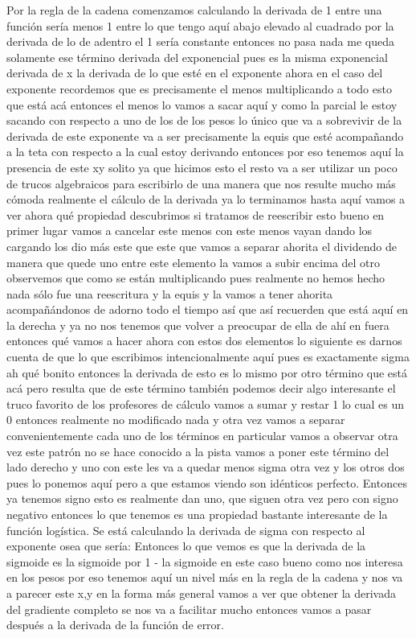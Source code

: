 Por la regla de la cadena comenzamos calculando la derivada de 1 entre una función sería menos 1 entre lo que tengo aquí abajo elevado al cuadrado por la derivada de lo de adentro el 1 sería constante entonces no pasa nada me queda solamente ese término derivada del exponencial pues es la misma exponencial derivada de x la derivada de lo que esté en el exponente ahora en el caso del exponente recordemos que es precisamente el menos multiplicando a todo esto que está acá entonces el menos lo vamos a sacar aquí y como la parcial le estoy sacando con respecto a uno de los de los pesos lo único que va a sobrevivir de la derivada de este exponente va a ser precisamente la equis que esté acompañando a la teta con respecto a la cual estoy derivando entonces por eso tenemos aquí la presencia de este xy solito ya que hicimos esto el resto va a ser utilizar un poco de trucos algebraicos para escribirlo de una manera que nos resulte mucho más cómoda realmente el cálculo de la derivada ya lo terminamos hasta aquí vamos a ver ahora qué propiedad descubrimos si tratamos de reescribir esto bueno en primer lugar vamos a cancelar este menos con este menos vayan dando los cargando los dio más este que este que vamos a separar ahorita el dividendo de manera que quede uno entre este elemento la vamos a subir encima del otro observemos que como se están multiplicando pues realmente no hemos hecho nada sólo fue una reescritura y la equis y la vamos a tener ahorita acompañándonos de adorno todo el tiempo así que así recuerden que está aquí en la derecha y ya no nos tenemos que volver a preocupar de ella de ahí en fuera entonces qué vamos a hacer ahora con estos dos elementos lo siguiente es darnos cuenta de que lo que escribimos intencionalmente aquí pues es exactamente sigma ah qué bonito entonces la derivada de esto es lo mismo por otro término que está acá pero resulta que de este término también podemos decir algo interesante el truco favorito de los profesores de cálculo vamos a sumar y restar 1 lo cual es un 0 entonces realmente no modificado nada y otra vez vamos a separar convenientemente cada uno de los términos en particular vamos a observar otra vez este patrón no se hace conocido a la pista vamos a poner este término del lado derecho y uno con  este les va a quedar menos sigma otra vez y los otros dos pues lo ponemos aquí pero a que estamos viendo son idénticos perfecto. Entonces ya tenemos signo esto es realmente dan uno, que siguen otra vez pero con signo negativo entonces lo que tenemos es una propiedad bastante interesante de la función logística. Se está calculando la derivada de sigma con respecto al exponente osea que sería:
Entonces lo que vemos es que la derivada de la sigmoide es la sigmoide por 1 - la sigmoide en este caso bueno como nos interesa en los pesos por eso tenemos aquí un nivel más en la regla de la cadena y nos va a parecer este x,y  en la forma más general vamos a ver que obtener la derivada del gradiente completo se nos va a facilitar mucho entonces vamos a pasar después a la derivada de la función de error.

